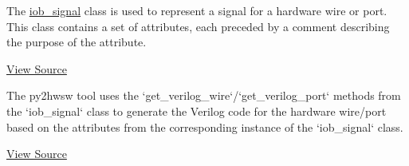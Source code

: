 %

%
%

The \href{https://github.com/IObundle/py2hwsw/blob/main/py2hwsw/scripts/iob_signal.py}{iob\_signal} class is used to represent a signal for a hardware wire or port.
This class contains a set of attributes, each preceded by a comment describing the purpose of the attribute.


\href{https://github.com/IObundle/py2hwsw/blob/main/py2hwsw/scripts/iob_signal.py}{View Source}

%
%

The py2hwsw tool uses the `get\_verilog\_wire`/`get\_verilog\_port` methods from the `iob\_signal` class to generate the Verilog code for the hardware wire/port based on the attributes from the corresponding instance of the `iob\_signal` class.



\href{https://github.com/IObundle/py2hwsw/blob/main/py2hwsw/scripts/iob_signal.py}{View Source}
